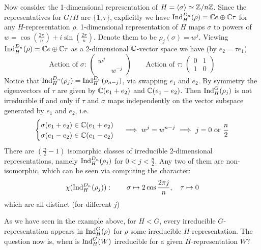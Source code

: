 \begin{example}[Representations of $D_n$]
    Now consider the 1-dimensional representation of $H = \left\langle \sigma \right\rangle \simeq \mathbb{Z}/n\mathbb{Z}$. Since the representatives for $G/H$ are $\{1, \tau\}$, explicitly we have $\mathrm{Ind}_H^{D_n} (\rho) = \mathbb{C} e \oplus \mathbb{C} \tau$ for any $H$-representation $\rho$. 1-dimensional representation of $H$ maps $\sigma$ to powers of $w = \cos(\frac{2\pi}{n}) + i \sin(\frac{2\pi}{n})$. Denote them to be $\rho_j (\sigma) = w^j$. Viewing $\mathrm{Ind}_H^{D_n} (\rho) = \mathbb{C} e \oplus \mathbb{C} \tau$ as a 2-dimensional $\mathbb{C}$-vector space we have (by $e_2 = \tau e_1$)
    \[
        \text{Action of $\sigma$: }
        \begin{pmatrix}
            w^j & \\
            & w^{-j}
        \end{pmatrix}
        \qquad
        \text{Action of $\tau$: }
        \begin{pmatrix}
            0 & 1 \\
            1 & 0
        \end{pmatrix}
    \]
    Notice that $\mathrm{Ind}_H^{D_n} (\rho_j) = \mathrm{Ind}_H^{D_n} (\rho_{n-j})$, via swapping $e_1$ and $e_2$. By symmetry the eigenvectors of $\tau$ are given by $\mathbb{C}(e_1 + e_2)$ and $\mathbb{C}(e_1 - e_2)$. Then $\mathrm{Ind}_H^G (\rho_j)$ is not irreducible if and only if $\tau$ and $\sigma$ maps independently on the vector subspace generated by $e_1$ and $e_2$, i.e. 
    \[
        \begin{cases}
            \sigma(e_1 + e_2) \in \mathbb{C}(e_1 + e_2) \\
            \sigma(e_1 - e_2) \in \mathbb{C}(e_1 - e_2) \\
        \end{cases}
        \ \Longrightarrow\  
        w^j = w^{n-j}
        \ \Longrightarrow\ 
        j = 0 \text{ or } \frac{n}{2}
    \]
     There are $\left( \frac{n}{2} - 1 \right)$ isomorphic classes of irreducible 2-dimensional representations, namely $\mathrm{Ind}_H^{D_n} (\rho_j)$ for $0 < j < \frac{n}{2}$. Any two of them are non-isomorphic, which can be seen via computing the character:
    \[
        \chi (\mathrm{Ind}_H^{D_n} (\rho_j)): \qquad \sigma \mapsto 2 \cos \frac{2\pi j}{n}, \quad \tau \mapsto 0
    \]
    which are all distinct (for different $j$)
\end{example}

As we have seen in the example above, for $H < G$, every irreducible $G$-representation appears in $\mathrm{Ind}_H^G(\rho)$ for $\rho$ some irreducible $H$-representation. The question now is, when is $\mathrm{Ind}_H^G(W)$ irreducible for a given $H$-representation $W$?

